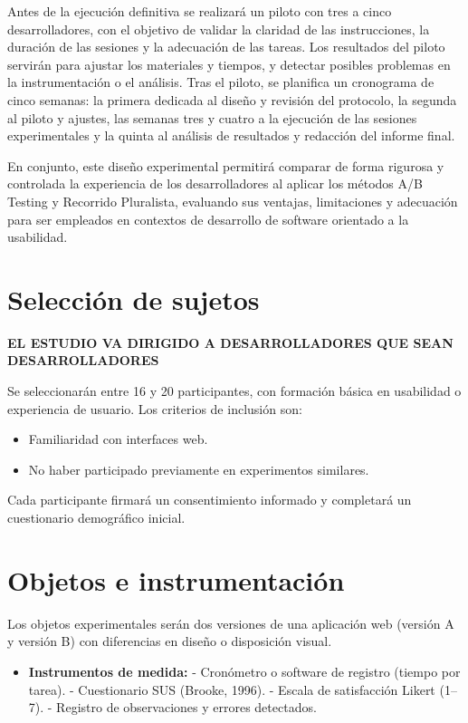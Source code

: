 \documentclass[a4paper,12pt]{report}
\begin{document}
Antes de la ejecución definitiva se realizará un piloto con tres a cinco desarrolladores, con el objetivo de validar la claridad de las instrucciones, la duración de las sesiones y la adecuación de las tareas. Los resultados del piloto servirán para ajustar los materiales y tiempos, y detectar posibles problemas en la instrumentación o el análisis. Tras el piloto, se planifica un cronograma de cinco semanas: la primera dedicada al diseño y revisión del protocolo, la segunda al piloto y ajustes, las semanas tres y cuatro a la ejecución de las sesiones experimentales y la quinta al análisis de resultados y redacción del informe final.

En conjunto, este diseño experimental permitirá comparar de forma rigurosa y controlada la experiencia de los desarrolladores al aplicar los métodos A/B Testing y Recorrido Pluralista, evaluando sus ventajas, limitaciones y adecuación para ser empleados en contextos de desarrollo de software orientado a la usabilidad.


\section{Selección de sujetos}
\textbf{EL ESTUDIO VA DIRIGIDO A DESARROLLADORES QUE SEAN DESARROLLADORES}

Se seleccionarán entre 16 y 20 participantes, con formación básica en usabilidad o experiencia de usuario. Los criterios de inclusión son:
\begin{itemize}
    \item Familiaridad con interfaces web.
    \item No haber participado previamente en experimentos similares.
\end{itemize}
Cada participante firmará un consentimiento informado y completará un cuestionario demográfico inicial.

\section{Objetos e instrumentación}
Los objetos experimentales serán dos versiones de una aplicación web (versión A y versión B) con diferencias en diseño o disposición visual.  
\begin{itemize}
    \item \textbf{Instrumentos de medida:}  
    - Cronómetro o software de registro (tiempo por tarea).  
    - Cuestionario SUS (Brooke, 1996).  
    - Escala de satisfacción Likert (1--7).  
    - Registro de observaciones y errores detectados.  
\end{itemize}
\end{document}
